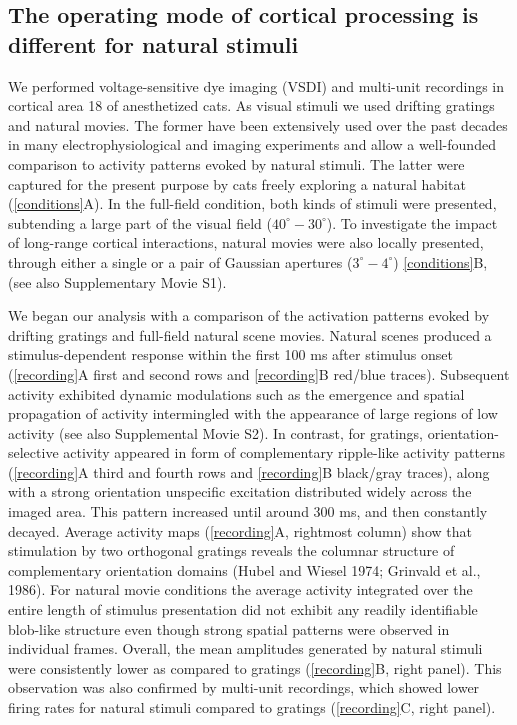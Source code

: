 \subsection{The operating mode of cortical processing is different for
natural stimuli} 


We performed voltage-sensitive dye imaging (VSDI) and multi-unit recordings
in cortical area 18 of anesthetized cats. As visual stimuli we used
drifting gratings and natural movies. The former have been extensively used
over the past decades in many electrophysiological and imaging experiments
and allow a well-founded comparison to activity patterns evoked by natural
stimuli. The latter were captured for the present purpose by cats freely
exploring a natural habitat (\ref{conditions}A). In the full-field
condition, both kinds of stimuli were presented, subtending a large part of
the visual field ($40^{\circ}-30^{\circ}$). To investigate the impact of
long-range cortical interactions, natural movies were also locally
presented, through either a single or a pair of Gaussian apertures
($3^{\circ}-4^{\circ}$) \ref{conditions}B, (see also Supplementary Movie
S1).  




We began our analysis with a comparison of the activation patterns evoked
by drifting gratings and full-field natural scene movies.  Natural scenes
produced a stimulus-dependent response within the first 100 ms after
stimulus onset (\ref{recording}A first and second rows and \ref{recording}B
red/blue traces).  Subsequent activity exhibited dynamic modulations such
as the emergence and spatial propagation of activity intermingled with the
appearance of large regions of low activity (see also Supplemental Movie
S2). In contrast, for gratings, orientation-selective activity appeared in
form of complementary ripple-like activity patterns (\ref{recording}A third
and fourth rows and \ref{recording}B black/gray traces), along with a
strong orientation unspecific excitation distributed widely across the
imaged area. This pattern increased until around 300 ms, and then
constantly decayed.  Average activity maps (\ref{recording}A, rightmost
column) show that stimulation by two orthogonal gratings reveals the
columnar structure of complementary orientation domains (Hubel and Wiesel
1974; Grinvald et al., 1986). For natural movie conditions the average
activity integrated over the entire length of stimulus presentation did not
exhibit any readily identifiable blob-like structure even though strong
spatial patterns were observed in individual frames. Overall, the mean
amplitudes generated by natural stimuli were consistently lower as compared
to gratings (\ref{recording}B, right panel). This observation was also
confirmed by multi-unit recordings, which showed lower firing rates for
natural stimuli compared to gratings (\ref{recording}C, right panel).  

